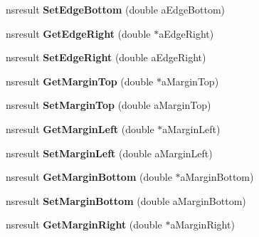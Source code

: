 \begin{DoxyCompactItemize}
nsresult {\bfseries Set\+Edge\+Bottom} (double a\+Edge\+Bottom)
\item 
\mbox{\label{interfacens_i_print_settings_a5a3e77f85623d286e70cb432ecc4a61b}} 
nsresult {\bfseries Get\+Edge\+Right} (double $\ast$a\+Edge\+Right)
\item 
\mbox{\label{interfacens_i_print_settings_a22be129beaeb16dfa0855134c0ab8a13}} 
nsresult {\bfseries Set\+Edge\+Right} (double a\+Edge\+Right)
\item 
\mbox{\label{interfacens_i_print_settings_ad0c6e18a1237480aa22b46337449e089}} 
nsresult {\bfseries Get\+Margin\+Top} (double $\ast$a\+Margin\+Top)
\item 
\mbox{\label{interfacens_i_print_settings_a7c352dc812d23ea024e495ff4448ad91}} 
nsresult {\bfseries Set\+Margin\+Top} (double a\+Margin\+Top)
\item 
\mbox{\label{interfacens_i_print_settings_abe70bc8602412a5e11e49578685ebf0b}} 
nsresult {\bfseries Get\+Margin\+Left} (double $\ast$a\+Margin\+Left)
\item 
\mbox{\label{interfacens_i_print_settings_affda359f0b5331b4987b8e022b320d68}} 
nsresult {\bfseries Set\+Margin\+Left} (double a\+Margin\+Left)
\item 
\mbox{\label{interfacens_i_print_settings_a94a17ee1dd90a96a54dece05dba52dff}} 
nsresult {\bfseries Get\+Margin\+Bottom} (double $\ast$a\+Margin\+Bottom)
\item 
\mbox{\label{interfacens_i_print_settings_a868bcc2ca1adbbfb4d7c029604f22c5e}} 
nsresult {\bfseries Set\+Margin\+Bottom} (double a\+Margin\+Bottom)
\item 
\mbox{\label{interfacens_i_print_settings_a017af7e380fff1c838f9e2c7c983ad5a}} 
nsresult {\bfseries Get\+Margin\+Right} (double $\ast$a\+Margin\+Right)
\item 
\mbox{\label{interfacens_i_print_settings_a30c6fc32576c95dc86c193a0c85a7a3b}} 

\end{DoxyCompactItemize}
